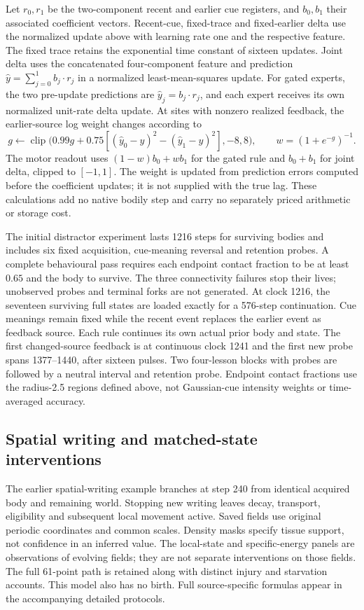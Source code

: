 Let $r_0,r_1$ be the two-component recent and earlier cue registers, and $b_0,b_1$ their associated coefficient vectors. Recent-cue, fixed-trace and fixed-earlier delta use the normalized update above with learning rate one and the respective feature. The fixed trace retains the exponential time constant of sixteen updates. Joint delta uses the concatenated four-component feature and prediction $\hat y=\sum_{j=0}^1 b_j\cdot r_j$ in a normalized least-mean-squares update. For gated experts, the two pre-update predictions are $\hat y_j=b_j\cdot r_j$, and each expert receives its own normalized unit-rate delta update. At sites with nonzero realized feedback, the earlier-source log weight changes according to
\begin{equation}
g\leftarrow\operatorname{clip}\bigl(0.99g+0.75[(\hat y_0-y)^2-(\hat y_1-y)^2],-8,8\bigr),
\qquad w=(1+e^{-g})^{-1}.
\end{equation}
The motor readout uses $(1-w)b_0+wb_1$ for the gated rule and $b_0+b_1$ for joint delta, clipped to $[-1,1]$. The weight is updated from prediction errors computed before the coefficient updates; it is not supplied with the true lag. These calculations add no native bodily step and carry no separately priced arithmetic or storage cost.

The initial distractor experiment lasts 1216 steps for surviving bodies and includes six fixed acquisition, cue-meaning reversal and retention probes. A complete behavioural pass requires each endpoint contact fraction to be at least $0.65$ and the body to survive. The three connectivity failures stop their lives; unobserved probes and terminal forks are not generated. At clock 1216, the seventeen surviving full states are loaded exactly for a 576-step continuation. Cue meanings remain fixed while the recent event replaces the earlier event as feedback source. Each rule continues its own actual prior body and state. The first changed-source feedback is at continuous clock 1241 and the first new probe spans 1377--1440, after sixteen pulses. Two four-lesson blocks with probes are followed by a neutral interval and retention probe. Endpoint contact fractions use the radius-2.5 regions defined above, not Gaussian-cue intensity weights or time-averaged accuracy.


\subsection*{Spatial writing and matched-state interventions}

The earlier spatial-writing example branches at step 240 from identical acquired body and remaining world. Stopping new writing leaves decay, transport, eligibility and subsequent local movement active. Saved fields use original periodic coordinates and common scales. Density masks specify tissue support, not confidence in an inferred value. The local-state and specific-energy panels are observations of evolving fields; they are not separate interventions on those fields. The full 61-point path is retained along with distinct injury and starvation accounts. This model also has no birth. Full source-specific formulas appear in the accompanying detailed protocols.


